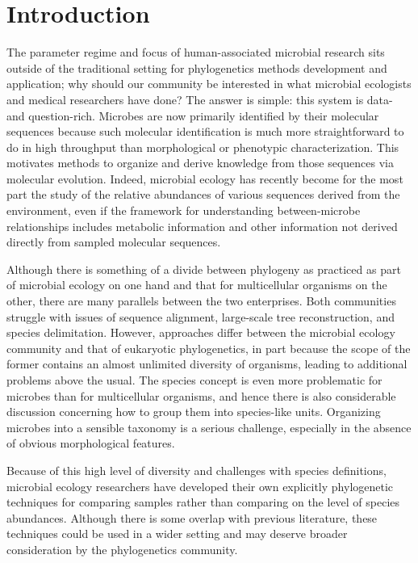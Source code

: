 \documentclass{amsart}
\begin{document}
\section{Introduction}

The parameter regime and focus of human-associated microbial research sits outside of the traditional setting for phylogenetics methods development and application; why should our community be interested in what microbial ecologists and medical researchers have done?
The answer is simple: this system is data- and question-rich.
Microbes are now primarily identified by their molecular sequences because such molecular identification is much more straightforward to do in high throughput than morphological or phenotypic characterization.
This motivates methods to organize and derive knowledge from those sequences via molecular evolution.
Indeed, microbial ecology has recently become for the most part the study of the relative abundances of various sequences derived from the environment, even if the framework for understanding between-microbe relationships includes metabolic information and other information not derived directly from sampled molecular sequences.

Although there is something of a divide between phylogeny as practiced as part of microbial ecology on one hand and that for multicellular organisms on the other, there are many parallels between the two enterprises.
Both communities struggle with issues of sequence alignment, large-scale tree reconstruction, and species delimitation.
However, approaches differ between the microbial ecology community and that of eukaryotic phylogenetics, in part because the scope of the former contains an almost unlimited diversity of organisms, leading to additional problems above the usual.
The species concept is even more problematic for microbes than for multicellular organisms, and hence there is also considerable discussion concerning how to group them into species-like units.
Organizing microbes into a sensible taxonomy is a serious challenge, especially in the absence of obvious morphological features.

Because of this high level of diversity and challenges with species definitions, microbial ecology researchers have developed their own explicitly phylogenetic techniques for comparing samples rather than comparing on the level of species abundances.
Although there is some overlap with previous literature, these techniques could be used in a wider setting and may deserve broader consideration by the phylogenetics community.
\end{document}
